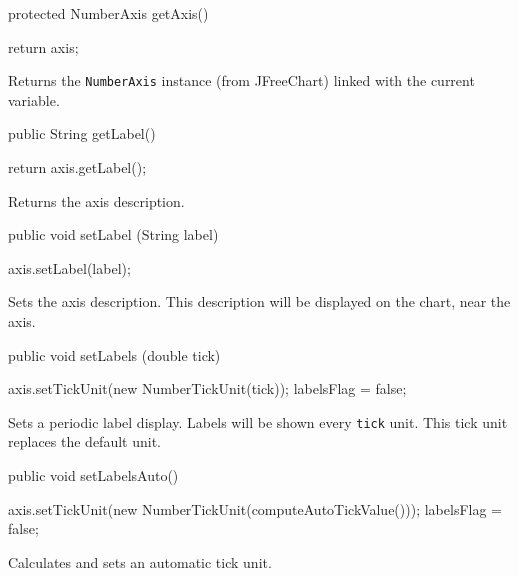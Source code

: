 \begin{code}

   protected NumberAxis getAxis() \begin{hide} {
      return axis;
   }\end{hide}
\end{code}
\begin{tabb}
   Returns the \texttt{NumberAxis} instance (from JFreeChart) linked with the current variable.
\end{tabb}
\begin{htmlonly}
\end{htmlonly}
\begin{code}

   public String getLabel() \begin{hide} {
      return axis.getLabel();
   }\end{hide}
\end{code}
\begin{tabb}
   Returns the axis description.
\end{tabb}
\begin{htmlonly}
\end{htmlonly}
\begin{code}

   public void setLabel (String label) \begin{hide} {
      axis.setLabel(label);
   }\end{hide}
\end{code}
\begin{tabb}
   Sets the axis description. This description will be displayed on the chart, near the axis.
\end{tabb}
\begin{htmlonly}
\end{htmlonly}
\begin{code}

   public void setLabels (double tick) \begin{hide} {
      axis.setTickUnit(new NumberTickUnit(tick));
      labelsFlag = false;
   }\end{hide}
\end{code}
\begin{tabb}
Sets a periodic label display. Labels will be shown every \texttt{tick} unit.
This tick unit replaces the default unit.
\end{tabb}
\begin{htmlonly}
\end{htmlonly}
\begin{code}

   public void setLabelsAuto() \begin{hide} {
      axis.setTickUnit(new NumberTickUnit(computeAutoTickValue()));
      labelsFlag = false;
   }\end{hide}
\end{code}
\begin{tabb}
   Calculates and sets an automatic tick unit.
\end{tabb}

